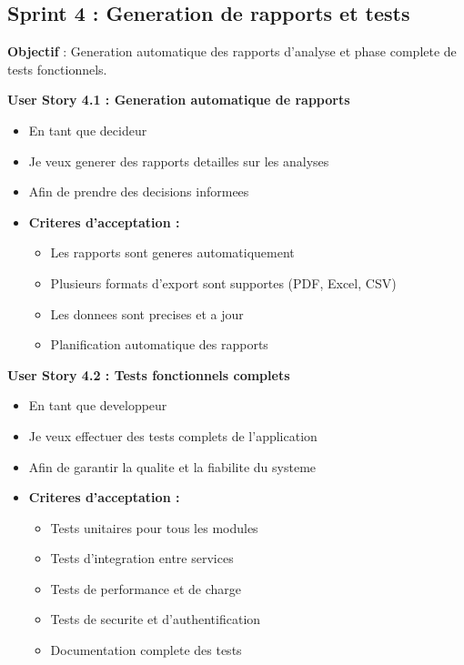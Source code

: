 \subsection{Sprint 4 : Generation de rapports et tests}

\textbf{Objectif} : Generation automatique des rapports d'analyse et phase complete de tests fonctionnels.

\textbf{User Story 4.1 : Generation automatique de rapports}
\begin{itemize}
    \item En tant que decideur
    \item Je veux generer des rapports detailles sur les analyses
    \item Afin de prendre des decisions informees
    \item \textbf{Criteres d'acceptation :}
    \begin{itemize}
        \item Les rapports sont generes automatiquement
        \item Plusieurs formats d'export sont supportes (PDF, Excel, CSV)
        \item Les donnees sont precises et a jour
        \item Planification automatique des rapports
    \end{itemize}
\end{itemize}

\textbf{User Story 4.2 : Tests fonctionnels complets}
\begin{itemize}
    \item En tant que developpeur
    \item Je veux effectuer des tests complets de l'application
    \item Afin de garantir la qualite et la fiabilite du systeme
    \item \textbf{Criteres d'acceptation :}
    \begin{itemize}
        \item Tests unitaires pour tous les modules
        \item Tests d'integration entre services
        \item Tests de performance et de charge
        \item Tests de securite et d'authentification
        \item Documentation complete des tests
    \end{itemize}
\end{itemize}

